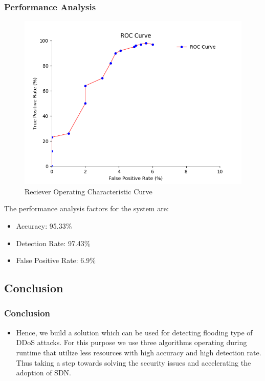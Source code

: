 \documentclass[10pt]{beamer}
\begin{document}
\begin{frame}
\frametitle{Performance Analysis}
\footnotesize

\begin{figure}
\includegraphics[scale=0.251]{2.png}
\caption{Reciever Operating Characteristic Curve}
\end{figure}

The performance analysis factors for the system are:
\begin{itemize}

\item
Accuracy: 95.33\%

\item
Detection Rate: 97.43\%

\item
False Positive Rate: 6.9\%
\end{itemize}
\end{frame}


\begin{frame}
\section[]{Conclusion}
\frametitle{Conclusion}

\footnotesize
\begin{itemize}
\item

Hence, we build a solution which can be used for detecting flooding type of DDoS attacks. For this purpose we use three algorithms operating during runtime that utilize less resources with high accuracy and high detection rate. Thus taking a step towards solving the security issues and accelerating the adoption of SDN.

\end{itemize}
\end{frame}
\end{document}
